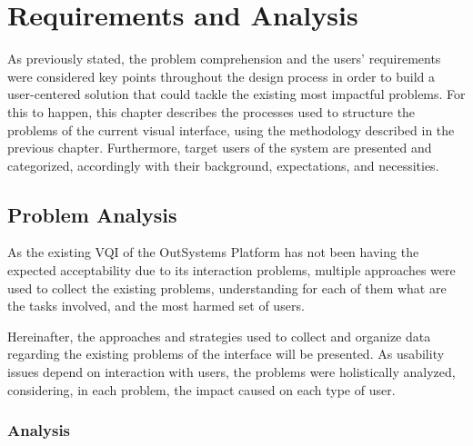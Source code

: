 \chapter{Requirements and Analysis}
\label{cha:requirements_and_analysis}

As previously stated, the problem comprehension and the users' requirements were considered key points throughout the design process in order to build a user-centered solution that could tackle the existing most impactful problems. For this to happen, this chapter describes the processes used to structure the problems of the current visual interface, using the methodology described in the previous chapter. Furthermore, target users of the system are presented and categorized, accordingly with their background, expectations, and necessities.

\section{Problem Analysis}
\label{sec:problem_analysis}

As the existing \gls{VQI} of the OutSystems Platform has not been having the expected acceptability due to its interaction problems, multiple approaches were used to collect the existing problems, understanding for each of them what are the tasks involved, and the most harmed set of users.

Hereinafter, the approaches and strategies used to collect and organize data regarding the existing problems of the interface will be presented. As usability issues depend on interaction with users, the problems were holistically analyzed, considering, in each problem, the impact caused on each type of user.

\subsection{Analysis}
\label{subsec:analysis}

